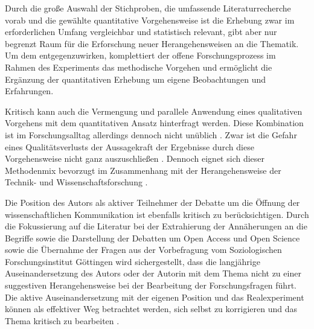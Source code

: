 Durch die große Auswahl der Stichproben, die umfassende Literaturrecherche vorab und die gewählte quantitative Vorgehensweise ist die Erhebung zwar im erforderlichen Umfang vergleichbar und statistisch relevant, gibt aber nur begrenzt Raum für die Erforschung neuer Herangehensweisen an die Thematik. Um dem entgegenzuwirken, komplettiert der offene Forschungsprozess im Rahmen des Experiments das methodische Vorgehen und ermöglicht die Ergänzung der quantitativen Erhebung um eigene Beobachtungen und Erfahrungen.

Kritisch kann auch die Vermengung und parallele Anwendung eines qualitativen Vorgehens mit dem quantitativen Ansatz hinterfragt werden. Diese Kombination ist im Forschungsalltag allerdings dennoch nicht unüblich \cite{Bortz_2006b}. Zwar ist die Gefahr eines Qualitätsverlusts der Aussagekraft der Ergebnisse durch diese Vorgehensweise nicht ganz auszuschließen \cite[:198]{Lamnek_1993}. Dennoch eignet sich dieser Methodenmix bevorzugt im Zusammenhang mit der Herangehensweise der Technik- und Wissenschaftsforschung \cite[:8]{Brown_2014}.

Die Position des Autors als aktiver Teilnehmer der Debatte um die Öffnung der wissenschaftlichen Kommunikation ist ebenfalls kritisch zu berücksichtigen. Durch die Fokussierung auf die Literatur bei der Extrahierung der Annäherungen an die Begriffe sowie die Darstellung der Debatten um Open Access und Open Science sowie die Übernahme der Fragen aus der Vorbefragung vom Soziologischen Forschungsinstitut Göttingen wird sichergestellt, dass die langjährige Auseinandersetzung des Autors oder der Autorin mit dem Thema nicht zu einer suggestiven Herangehensweise bei der Bearbeitung der Forschungsfragen führt. Die aktive Auseinandersetzung mit der eigenen Position und das Realexperiment können als effektiver Weg betrachtet werden, sich selbst zu korrigieren und das Thema kritisch zu bearbeiten \cite{Krohn_2005}.
